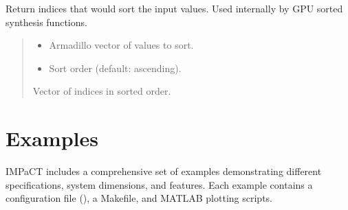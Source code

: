 \documentclass[a4paper,10pt,english]{sphinxmanual}
\begin{document}
\begin{fulllineitems}
\label{\detokenize{api/io-utils:_CPPv4N9IMPaCT_IO16getSortedIndicesERK3vecb}}\label{\detokenize{api/io-utils:_CPPv3N9IMPaCT_IO16getSortedIndicesERK3vecb}}\label{\detokenize{api/io-utils:_CPPv2N9IMPaCT_IO16getSortedIndicesERK3vecb}}\label{\detokenize{api/io-utils:IMPaCT_IO::getSortedIndices__vecCR.b}}
\pysigstartsignatures
\pysigstartmultiline
\pysiglinewithargsret
{}
{\sphinxparamcomma {}}
{}
\pysigstopmultiline
\pysigstopsignatures
\sphinxAtStartPar
Return indices that would sort the input values. Used internally by GPU
sorted synthesis functions.
\begin{quote}\begin{description}
\begin{itemize}
\item {} 
\sphinxAtStartPar
{} \textendash{} Armadillo vector of values to sort.

\item {} 
\sphinxAtStartPar
{} \textendash{} Sort order (default: ascending).

\end{itemize}

\sphinxAtStartPar
Vector of indices in sorted order.

\end{description}\end{quote}

\end{fulllineitems}


\sphinxstepscope


\section{Examples}
\label{\detokenize{examples/index:examples}}\label{\detokenize{examples/index::doc}}
\sphinxAtStartPar
IMPaCT includes a comprehensive set of examples demonstrating different
specifications, system dimensions, and features. Each example contains a
configuration file (), a Makefile, and MATLAB plotting scripts.
\end{document}
